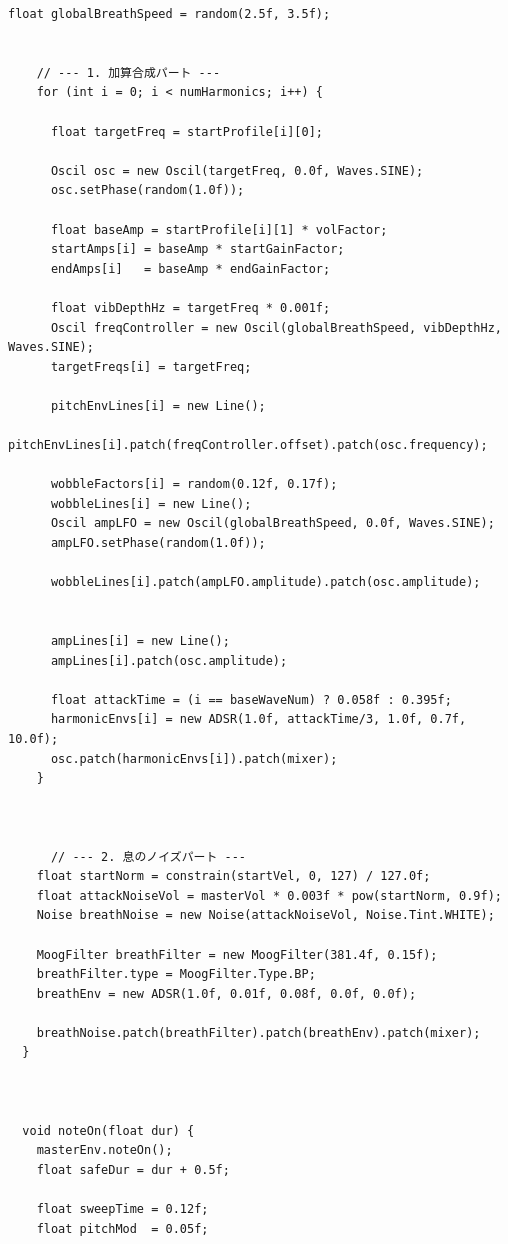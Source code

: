 \begin{lstlisting}[caption={Horn.pde}, label={lst:proc_horn}]
    float globalBreathSpeed = random(2.5f, 3.5f);
    
    
    // --- 1. 加算合成パート ---
    for (int i = 0; i < numHarmonics; i++) {
      
      float targetFreq = startProfile[i][0];
      
      Oscil osc = new Oscil(targetFreq, 0.0f, Waves.SINE);
      osc.setPhase(random(1.0f));
      
      float baseAmp = startProfile[i][1] * volFactor;
      startAmps[i] = baseAmp * startGainFactor;
      endAmps[i]   = baseAmp * endGainFactor;
      
      float vibDepthHz = targetFreq * 0.001f; 
      Oscil freqController = new Oscil(globalBreathSpeed, vibDepthHz, Waves.SINE);
      targetFreqs[i] = targetFreq;
      
      pitchEnvLines[i] = new Line();
      pitchEnvLines[i].patch(freqController.offset).patch(osc.frequency);  
      
      wobbleFactors[i] = random(0.12f, 0.17f);
      wobbleLines[i] = new Line();
      Oscil ampLFO = new Oscil(globalBreathSpeed, 0.0f, Waves.SINE);
      ampLFO.setPhase(random(1.0f));
      
      wobbleLines[i].patch(ampLFO.amplitude).patch(osc.amplitude);
      
      
      ampLines[i] = new Line();
      ampLines[i].patch(osc.amplitude); 
      
      float attackTime = (i == baseWaveNum) ? 0.058f : 0.395f;
      harmonicEnvs[i] = new ADSR(1.0f, attackTime/3, 1.0f, 0.7f, 10.0f);
      osc.patch(harmonicEnvs[i]).patch(mixer);
    }
    
    
    
      // --- 2. 息のノイズパート ---
    float startNorm = constrain(startVel, 0, 127) / 127.0f;
    float attackNoiseVol = masterVol * 0.003f * pow(startNorm, 0.9f); 
    Noise breathNoise = new Noise(attackNoiseVol, Noise.Tint.WHITE);
    
    MoogFilter breathFilter = new MoogFilter(381.4f, 0.15f);
    breathFilter.type = MoogFilter.Type.BP;
    breathEnv = new ADSR(1.0f, 0.01f, 0.08f, 0.0f, 0.0f);
    
    breathNoise.patch(breathFilter).patch(breathEnv).patch(mixer);
  }
  
  
  
  void noteOn(float dur) {
    masterEnv.noteOn();
    float safeDur = dur + 0.5f;
    
    float sweepTime = 0.12f;
    float pitchMod  = 0.05f;
    

\end{lstlisting}
